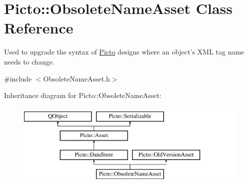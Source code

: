 \hypertarget{class_picto_1_1_obsolete_name_asset}{\section{Picto\-:\-:Obsolete\-Name\-Asset Class Reference}
\label{class_picto_1_1_obsolete_name_asset}
}


Used to upgrade the syntax of \hyperlink{namespace_picto}{Picto} designs where an object's X\-M\-L tag name needs to change.  




{\ttfamily \#include $<$Obsolete\-Name\-Asset.\-h$>$}

Inheritance diagram for Picto\-:\-:Obsolete\-Name\-Asset\-:\begin{figure}[H]
\begin{center}
\leavevmode
\includegraphics[height=4.000000cm]{class_picto_1_1_obsolete_name_asset}
\end{center}
\end{figure}

